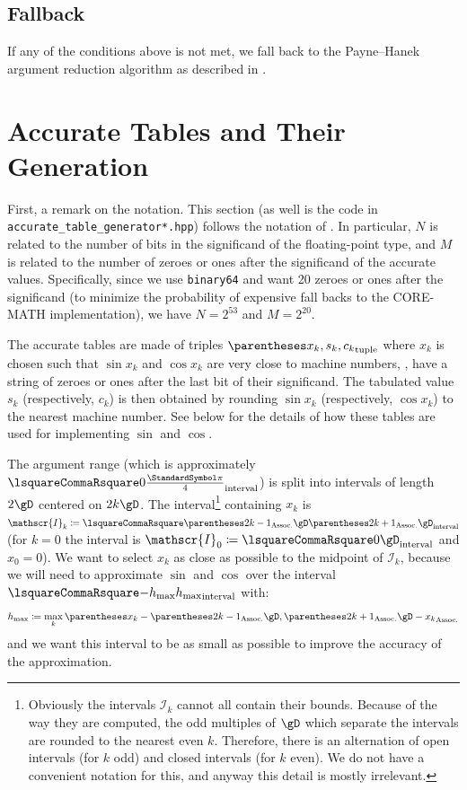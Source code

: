 \documentclass[10pt, a4paper, twoside]{basestyle}
\begin{document}
\subsection*{Fallback}

If any of the conditions above is not met, we fall back to the Payne--Hanek argument reduction algorithm as described in \cite[154-157]{Muller1997}.

\section*{Accurate Tables and Their Generation}

First, a remark on the notation.  This section (as well is the code in \linebreak\texttt{accurate\_table\_generator*.hpp}) follows the notation of \cite{StehléZimmermann2005}.  In particular, $N$ is related to the number of bits in the significand of the floating-point type, and $M$ is related to the number of zeroes or ones after the significand of the accurate values.  Specifically, since we use \texttt{binary64} and want 20 zeroes or ones after the significand (to minimize the probability of expensive fall backs to the CORE-MATH implementation), we have $N = 2^{53}$ and $M = 2^{20}$. 

The accurate tables are made of triples $\tuple{x_k, s_k, c_k}$ where $x_k$ is chosen such that $\sin x_k$ and $\cos x_k$ are very close to machine numbers, \idest, have a string of zeroes or ones after the last bit of their significand.  The tabulated value $s_k$ (respectively, $c_k$) is then obtained by rounding $\sin x_k$ (respectively, $\cos x_k$) to the nearest machine number.  See  below for the details of how these tables are used for implementing $\sin$ and $\cos$.

The argument range (which is approximately $\intclos{0}{\frac{\Pi}{4}}$) is split into intervals of length $2 \gD$ centered on $2 k \gD$.  The interval\footnote{Obviously the intervals $\mathscr{I}_k$ cannot all contain their bounds.  Because of the way they are computed, the odd multiples of $\gD$ which separate the intervals are rounded to the nearest even $k$.  Therefore, there is an alternation of open intervals (for $k$ odd) and closed intervals (for $k$ even).  We do not have a convenient notation for this, and anyway this detail is mostly irrelevant.} containing $x_k$ is $\mathscr{I}_k \DefineAs \intclos{\pa{2 k - 1}\gD}{\pa{2 k + 1}\gD}$ (for $k = 0$ the interval is $\mathscr{I}_0 \DefineAs \intclos{0}{\gD}$ and $x_0 = 0$).  We want to select $x_k$ as close as possible to the midpoint of $\mathscr{I}_k$, because we will need to approximate $\sin$ and $\cos$ over the interval $\intclos{-h_{\text{max}}}{h_{\text{max}}}$ with:
\[
h_{\text{max}} \DefineAs \max_k \pa{x_k - \pa{2 k - 1} \gD, \pa{2 k + 1} \gD - x_k}
\]
and we want this interval to be as small as possible to improve the accuracy of the approximation.
\end{document}
